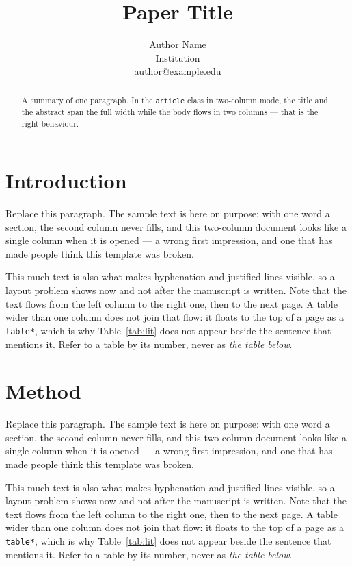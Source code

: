 \documentclass[10pt,a4paper,twocolumn]{article}
\title{\bfseries Paper Title}
\author{Author Name\\ \small Institution \\ \small author@example.edu}
\date{}
\begin{document}
\maketitle

\begin{abstract}
\noindent A summary of one paragraph. In the \texttt{article} class in two-column mode, the title and
the abstract span the full width while the body flows in two columns --- that is the right behaviour.
\end{abstract}

\section{Introduction}
Replace this paragraph. The sample text is here on purpose: with one word a section, the second column never fills, and this two-column document looks like a single column when it is opened --- a wrong first impression, and one that has made people think this template was broken.

This much text is also what makes hyphenation and justified lines visible, so a layout problem shows now and not after the manuscript is written. Note that the text flows from the left column to the right one, then to the next page. A table wider than one column does not join that flow: it floats to the top of a page as a \texttt{table*}, which is why Table~\ref{tab:lit} does not appear beside the sentence that mentions it. Refer to a table by its number, never as \emph{the table below}.

\section{Method}
Replace this paragraph. The sample text is here on purpose: with one word a section, the second column never fills, and this two-column document looks like a single column when it is opened --- a wrong first impression, and one that has made people think this template was broken.

This much text is also what makes hyphenation and justified lines visible, so a layout problem shows now and not after the manuscript is written. Note that the text flows from the left column to the right one, then to the next page. A table wider than one column does not join that flow: it floats to the top of a page as a \texttt{table*}, which is why Table~\ref{tab:lit} does not appear beside the sentence that mentions it. Refer to a table by its number, never as \emph{the table below}.
\end{document}
